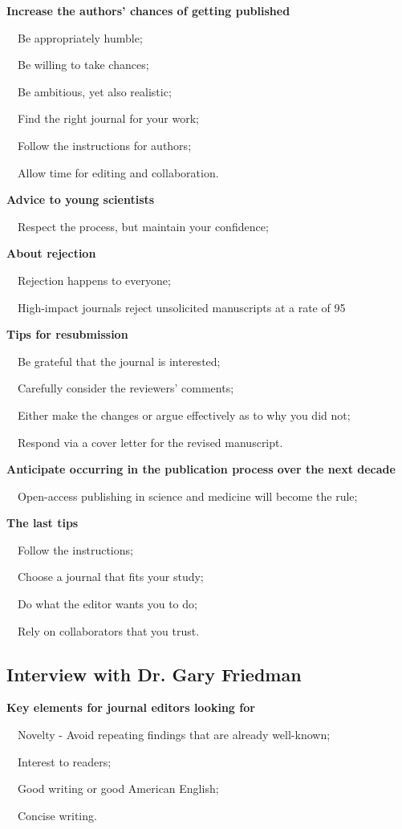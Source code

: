 \documentclass[a4paper, 12pt]{article}
\begin{document}
\textbf{Increase the authors' chances of getting published}
\par\ \textbullet\ Be appropriately humble;
\par\ \textbullet\ Be willing to take chances;
\par\ \textbullet\ Be ambitious, yet also realistic;
\par\ \textbullet\ Find the right journal for your work;
\par\ \textbullet\ Follow the instructions for authors;
\par\ \textbullet\ Allow time for editing and collaboration.

\textbf{Advice to young scientists}
\par\ \textbullet\ Respect the process, but maintain your confidence;

\textbf{About rejection}
\par\ \textbullet\ Rejection happens to everyone;
\par\ \textbullet\ High-impact journals reject unsolicited manuscripts at a rate of 95%

\textbf{Tips for resubmission}
\par\ \textbullet\ Be grateful that the journal is interested;
\par\ \textbullet\ Carefully consider the reviewers' comments;
\par\ \textbullet\ Either make the changes or argue effectively as to why you did not;
\par\ \textbullet\ Respond via a cover letter for the revised manuscript.

\textbf{Anticipate occurring in the publication process over the next decade}
\par\ \textbullet\ Open-access publishing in science and medicine will become the rule;

\textbf{The last tips}
\par\ \textbullet\ Follow the instructions;
\par\ \textbullet\ Choose a journal that fits your study;
\par\ \textbullet\ Do what the editor wants you to do;
\par\ \textbullet\ Rely on collaborators that you trust.

\subsection{Interview with Dr. Gary Friedman}

\textbf{Key elements for journal editors looking for}
\par\ \textbullet\ Novelty - Avoid repeating findings that are already well-known;
\par\ \textbullet\ Interest to readers;
\par\ \textbullet\ Good writing or good American English;
\par\ \textbullet\ Concise writing.
\end{document}
